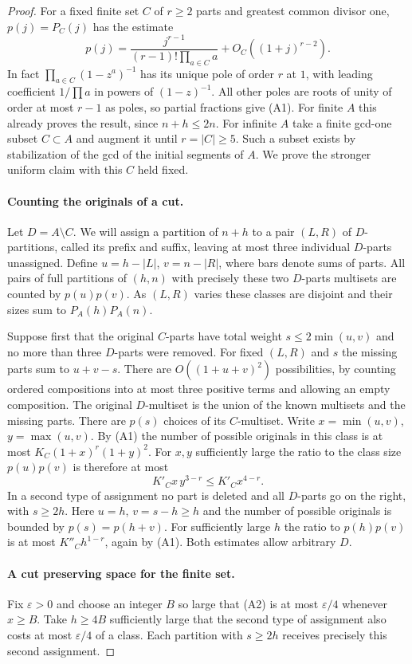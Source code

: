 \documentclass[11pt,a4paper]{article}
\numberwithin{equation}{section}
\begin{document}
\begin{proof}
For a fixed finite set $C$ of $r\ge2$ parts and greatest common divisor
one, $p(j)=P_C(j)$ has the estimate
\[
 p(j)=\frac{j^{r-1}}{(r-1)!\prod_{a\in C}a}+O_C((1+j)^{r-2}).
\tag{A1}
\]
In fact $\prod_{a\in C}(1-z^a)^{-1}$ has its unique pole of
order $r$ at $1$, with leading coefficient $1/\prod a$ in powers of
$(1-z)^{-1}$. All other poles are roots of unity of order at most
$r-1$ as poles, so partial fractions give (A1).
For finite $A$ this already proves the result, since $n+h\le2n$.
For infinite $A$ take a finite gcd-one subset $C\subset A$ and augment
it until $r=|C|\ge5$. Such a subset exists by stabilization of the
gcd of the initial segments of $A$. We prove the stronger uniform
claim with this $C$ held fixed.

\paragraph{Counting the originals of a cut.}
Let $D=A\setminus C$. We will assign a partition of $n+h$ to a pair
$(L,R)$ of $D$-partitions, called its prefix and suffix, leaving
at most three individual $D$-parts unassigned. Define
$u=h-|L|$, $v=n-|R|$, where bars denote sums of parts. All pairs
of full partitions of $(h,n)$ with precisely these two $D$-parts
multisets are counted by $p(u)p(v)$. As $(L,R)$ varies these
classes are disjoint and their sizes sum to $P_A(h)P_A(n)$.

Suppose first that the original $C$-parts have total weight
$s\le2\min(u,v)$ and no more than three $D$-parts were removed.
For fixed $(L,R)$ and $s$ the missing parts sum to $u+v-s$.
There are $O((1+u+v)^2)$ possibilities, by counting ordered
compositions into at most three positive terms and allowing an
empty composition. The original $D$-multiset is the union of the
known multisets and the missing parts. There are $p(s)$ choices of
its $C$-multiset. Write $x=\min(u,v)$, $y=\max(u,v)$. By (A1) the
number of possible originals in this class is at most
$K_C(1+x)^r(1+y)^2$. For $x,y$ sufficiently large the ratio to
the class size $p(u)p(v)$ is therefore at most
\[
 K'_C x\,y^{3-r}\le K'_C x^{4-r}.
\tag{A2}
\]
In a second type of assignment no part is deleted and all $D$-parts
go on the right, with $s\ge2h$. Here $u=h$, $v=s-h\ge h$ and
the number of possible originals is bounded by $p(s)=p(h+v)$.
For sufficiently large $h$ the ratio to $p(h)p(v)$ is at most
$K''_C h^{1-r}$, again by (A1). Both estimates allow arbitrary $D$.

\paragraph{A cut preserving space for the finite set.}
Fix $\varepsilon>0$ and choose an integer $B$ so large that (A2)
is at most $\varepsilon/4$ whenever $x\ge B$.
Take $h\ge 4B$ sufficiently large that the second type of assignment
also costs at most $\varepsilon/4$ of a class. Each partition with
$s\ge2h$ receives precisely this second assignment.


\end{proof}
\end{document}
